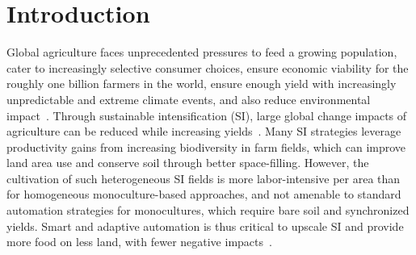 
\section{Introduction}

Global agriculture faces unprecedented pressures to feed a growing population, cater to increasingly selective consumer choices, ensure economic viability for the roughly one billion farmers in the world, ensure enough yield with increasingly unpredictable and extreme climate events, and also reduce environmental impact~\cite{McGreevy2022}. Through sustainable intensification (SI), large global change impacts of agriculture can be reduced while increasing yields~\cite{Cassman2020, Pretty2018, Garnett2013}. Many SI strategies leverage productivity gains from increasing biodiversity in farm fields, which can improve land area use and conserve soil through better space-filling. However, the cultivation of such heterogeneous SI fields is more labor-intensive per area than for homogeneous monoculture-based approaches, and not amenable to standard automation strategies for monocultures, which require bare soil and synchronized yields. Smart and adaptive automation is thus critical to upscale SI and provide more food on less land, with fewer negative impacts~\cite{Sparrow2021, Basso2020}.

